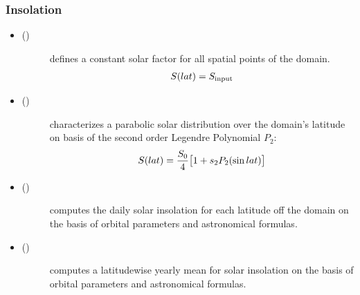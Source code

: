 \documentclass[a4paper,10pt,english]{sphinxmanual}
\begin{document}
\subsubsection{Insolation}
\label{models:insolation}\begin{itemize}
\item {} \begin{description}
\item[{{\hyperref[api/climlab.radiation:climlab.radiation.insolation.FixedInsolation]{\emph{}}} ()}] \leavevmode
defines a constant solar factor for all spatial points of the domain.
\begin{gather}
\begin{split}S(lat) = S_{\textrm{input}}\end{split}\notag
\end{gather}
\end{description}

\item {} \begin{description}
\item[{{\hyperref[api/climlab.radiation:climlab.radiation.insolation.P2Insolation]{\emph{}}} ()}] \leavevmode
characterizes a parabolic solar distribution over the domain's latitude on basis of the second order Legendre Polynomial \(P_2\):
\begin{gather}
\begin{split}S(lat) = \frac{S_0}{4} \big[1+ s_2 P_2(\sin lat) \big]\end{split}\notag
\end{gather}
\end{description}

\item {} \begin{description}
\item[{{\hyperref[api/climlab.radiation:climlab.radiation.insolation.DailyInsolation]{\emph{}}} ()}] \leavevmode
computes the daily solar insolation for each latitude off the domain on the basis of orbital parameters and astronomical formulas.

\end{description}

\item {} \begin{description}
\item[{{\hyperref[api/climlab.radiation:climlab.radiation.insolation.AnnualMeanInsolation]{\emph{}}} ()}] \leavevmode
computes a latitudewise yearly mean for solar insolation on the basis of orbital parameters and astronomical formulas.

\end{description}

\end{itemize}
\end{document}
